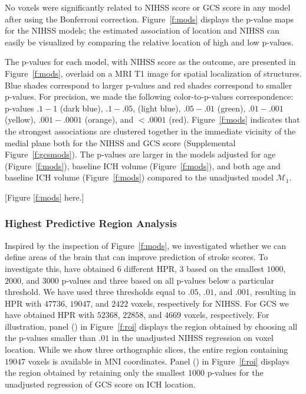 \documentclass[10pt]{article}\usepackage[]{graphicx}\usepackage[]{color}
\begin{document}
No voxels were significantly related to NIHSS score or GCS score in any model after using the Bonferroni correction.  Figure~\ref{f:mods} displays the p-value maps for the NIHSS models; the estimated association of location and NIHSS can easily be visualized by comparing the relative location of high and low p-values. 

The p-values for each model, with NIHSS score as the outcome, are presented in Figure~\ref{f:mods}, overlaid on a MRI T1 image for spatial localization of structures.  Blue shades correspond to larger p-values and red shades correspond to smaller p-values.  For precision, we made the following color-to-p-values correspondence: p-values $.1-1$ (dark blue), $.1-.05$, (light blue), $.05-.01$ (green), $.01-.001$ (yellow),  $.001-.0001$ (orange), and $< .0001$ (red).  Figure~\ref{f:mods} indicates that the strongest associations are clustered together in the immediate vicinity of the medial plane both for the NIHSS and GCS score (Supplemental Figure~\ref{f:gcsmods}).  The p-values are larger in the models adjusted for age (Figure~\ref{f:mods}\protect{}), baseline ICH volume (Figure~\ref{f:mods}\protect{}), and both age and baseline ICH volume (Figure~\ref{f:mods}\protect{}) compared to the unadjusted model $\mathcal{M}_1$.  

[Figure \ref{f:mods} here.]

\subsubsection{Highest Predictive Region Analysis}






Inspired by the inspection of Figure~\ref{f:mods}, we investigated whether we can define areas of the brain that can improve prediction of stroke scores. To investigate this, have obtained 6 different HPR, 3 based on the smallest $1000$, $2000$, and $3000$ p-values and three based on all p-values below a particular threshold. We have used three thresholds equal to $.05$, $.01$, and $.001$, resulting in HPR with $47736$, $19047$, and $2422$ voxels, respectively for NIHSS. 
For GCS we have obtained HPR with $52368$, $22858$, and $4669$ voxels, respectively. For illustration, panel (\protect{}) in Figure~\ref{f:roi} displays the region obtained by choosing all the p-values smaller than $.01$ in the unadjusted NIHSS regression on voxel location.  While we show three orthographic slices, the entire region containing $19047$ voxels is available in MNI coordinates. Panel (\protect{}) in Figure~\ref{f:roi} displays the region obtained by retaining only the smallest $1000$ p-values for the unadjusted regression of GCS score on ICH location. 
\end{document}
